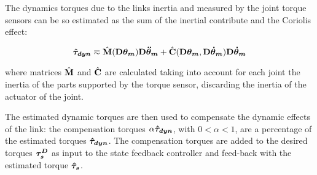 The dynamics torques due to the links inertia and measured by the joint torque sensors can be so estimated as the sum of the inertial contribute and the Coriolis effect:

\begin{equation}
{ \boldsymbol {\hat{\tau}_{dyn}}}  \eqsim \hat{\mathbf{M}}(\mathbf{D} { \boldsymbol {\theta_m}}) \mathbf{D} { \boldsymbol {\ddot{\theta}_m}}+\hat{\mathbf{C}}(\mathbf{D} { \boldsymbol {\theta_m}},\mathbf{D} { \boldsymbol {\dot{\theta}_m}})\mathbf{D} { \boldsymbol {\dot{\theta}_m}}
\end{equation}

where matrices $\hat{\mathbf{M}}$ and $\hat{\mathbf{C}}$ are calculated taking into account for each joint the inertia of the parts supported by the torque sensor, discarding the inertia of the actuator of the joint.

The estimated dynamic torques are then used to compensate the dynamic effects of the link: the compensation torques $\alpha { \boldsymbol {\hat{\tau}_{dyn}}}$, with $0<\alpha<1$, are a percentage of the estimated torques ${ \boldsymbol {\hat{\tau}_{dyn}}}$. The compensation torques are added to the desired torques ${ \boldsymbol {\tau_s^D}}$ as input to the state feedback controller and feed-back with the estimated torque ${ \boldsymbol {\hat{\tau}_s}}$. 


